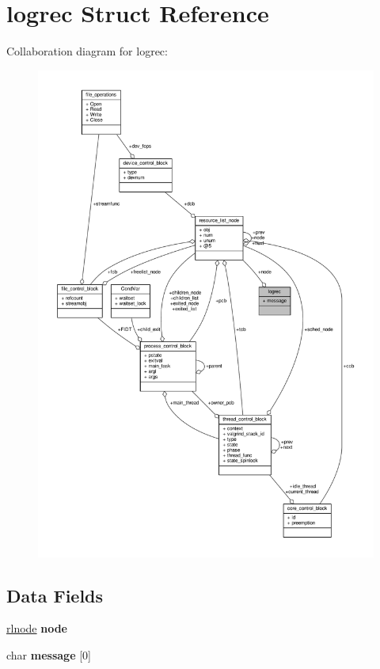 \hypertarget{structlogrec}{\section{logrec Struct Reference}
\label{structlogrec}
}


Collaboration diagram for logrec\-:
\nopagebreak
\begin{figure}[H]
\begin{center}
\leavevmode
\includegraphics[width=350pt]{structlogrec__coll__graph}
\end{center}
\end{figure}
\subsection*{Data Fields}
\begin{DoxyCompactItemize}
\item 
\hypertarget{structlogrec_ab1f7006e72b67ba7b9d0b26713997aa5}{\hyperlink{group__rlists_ga8f6244877f7ce2322c90525217ea6e7a}{rlnode} {\bfseries node}}\label{structlogrec_ab1f7006e72b67ba7b9d0b26713997aa5}

\item 
\hypertarget{structlogrec_ad21f53e0393fccb77219c1d9d94b7d23}{char {\bfseries message} \mbox{[}0\mbox{]}}\label{structlogrec_ad21f53e0393fccb77219c1d9d94b7d23}

\end{DoxyCompactItemize}


